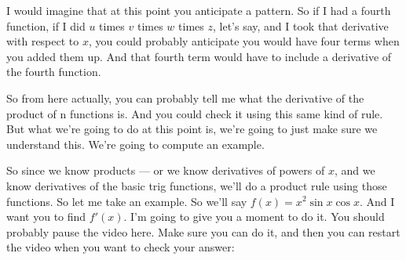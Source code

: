 \documentclass[pdftex, brazil, 12pt, twoside]{article}
\begin{document}
\begin{figure}[H]
  \begin{center}
  \end{center}
\end{figure}

I would imagine that at this point you anticipate a pattern.
So if I had a fourth function, if I
did $u$ times $v$ times $w$ times $z$, let's say,
and I took that derivative with respect
to $x$, you could probably anticipate
you would have four terms when you added them up.
And that fourth term would have to include a derivative
of the fourth function.

So from here actually, you can probably
tell me what the derivative of the product of n functions is.
And you could check it using this same kind of rule.
But what we're going to do at this point is,
we're going to just make sure we understand this.
We're going to compute an example.

So since we know products --- or we know derivatives
of powers of $x$, and we know derivatives of the basic trig
functions, we'll do a product rule using those functions.
So let me take an example.
So we'll say $f(x) = x^2 \sin{x} \cos{x}$.
And I want you to find $f'(x)$.
I'm going to give you a moment to do it.
You should probably pause the video here.
Make sure you can do it, and then you
can restart the video when you want to check your answer:

\begin{figure}[H]
  \begin{center}
  \end{center}
\end{figure}
\end{document}

